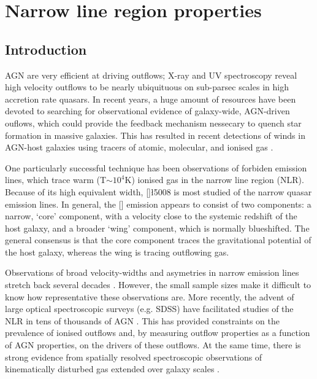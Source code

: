 
\chapter{Narrow line region properties}
\label{ch:nlr} 

\section{Introduction}

AGN are very efficient at driving outflows; X-ray and UV spectroscopy reveal high velocity outflows to be nearly ubiquituous on sub-parsec scales in high accretion rate quasars.
In recent years, a huge amount of resources have been devoted to searching for observational evidence of galaxy-wide, AGN-driven ouflows, which could provide the feedback mechanism nessecary to quench star formation in massive galaxies. 
This has resulted in recent detections of winds in AGN-host galaxies using tracers of atomic, molecular, and ionised gas \citep[e.g.][]{nesvadba06,arav08,nesvadba08,moe09,dunn10,alexander10,harrison12,harrison14,nesvadba10,rupke13,veilleux13,nardini15,feruglio10,alatalo11,cimatti13,cicone14}.  

One particularly successful technique has been observations of forbiden emission lines, which trace warm (T$\sim10^4$K) ionised gas in the narrow line region (NLR). 
Because of its high equivalent width, []\l5008 is most studied of the narrow quasar emission lines. 
In general, the [] emission appears to consist of two components: a narrow, `core' component, with a velocity close to the systemic redshift of the host galaxy, and a broader `wing' component, which is normally blueshifted. 
The general consensus is that the core component traces the gravitational potential of the host galaxy, whereas the wing is tracing outflowing gas. 

Observations of broad velocity-widths and asymetries in narrow emission lines stretch back several decades \citep[e.g.][]{weedman70,stockton76,heckman81,veron81,feldman82,heckman84,vrtilek85,whittle85,boroson92}. 
However, the small sample sizes make it difficult to know how representative these observations are. 
More recently, the advent of large optical spectroscopic surveys (e.g. SDSS) have facilitated studies of the NLR in tens of thousands of AGN \citep[e.g.][]{boroson05,greene05a,zhang11,mullaney13,zakamska14,shen14}. 
This has provided constraints on the prevalence of ionised outflows and, by measuring outflow properties as a function of AGN properties, on the drivers of these outflows.  
At the same time, there is strong evidence from spatially resolved spectroscopic observations of kinematically disturbed gas extended over galaxy scales \citep[e.g.][]{greene09,greene11,hainline13,harrison12,harrison14}. 

